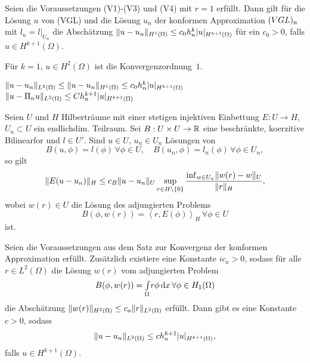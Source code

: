 \documentclass{cheat-sheet}
\newcommand{\IntOmega}[2]{\AInt{\Omega}{#1}{#2}} %
\newcommand{\tss}[1]{\textsubscript{#1}} %
\newcommand{\scp}[2]{\left\langle #1 , #2 \right\rangle} %
\begin{document}
\begin{satz}
  Seien die Voraussetzungen (V1)-(V3) und (V4) mit $r = 1$ erfüllt.
  Dann gilt für die Lösung $u$ von (VGL) und die Lösung $u_n$ der konformen Approximation $(VGL)\tss{n}$ mit $l_n = l|_{U_n}$ die Abschätzung $\lVert u - u_n\rVert_{H^1(\Omega)} \leq c_0 h_n^k \lvert u\rvert_{H^{k+1}(\Omega)}$ für ein $c_0 > 0$, falls $u \in H^{k+1}(\Omega)$.
\end{satz}

\begin{bem}
  Für $k=1$, $u \in H^2(\Omega)$ ist die Konvergenzordnung~$1$.
\end{bem}

\begin{bem}
  $\lVert u - u_n\rVert_{L^2(\Omega)} \leq \lVert u - u_n\rVert_{H^1(\Omega)} \leq c_0 h_n^k \lvert u\rvert_{H^{k+1}(\Omega)}$
  $\lVert u - \Pi_n u\rVert_{L^2(\Omega)} \leq C h_n^{k+1} \lvert u\rvert_{H^{k+1}(\Omega)}$
\end{bem}

\begin{satz}
  Seien $U$ und $H$ Hilberträume mit einer stetigen injektiven Einbettung $E : U \to H$, $U_n \subset U$ ein endlichdim. Teilraum.
  Sei $B : U \times U \to \mathbb{R}$ eine beschränkte, koerzitive Bilinearfor und $l \in U'$.
  Sind $u \in U$, $u_n \in U_n$ Lösungen von
  \[
    B(u, \phi) = l(\phi) \, \forall \phi \in U, \quad
    B(u_n, \phi) = l_n(\phi) \, \forall \phi \in U_n,
  \]
  so gilt
  \[
    \lVert E (u - u_n)\rVert_H \leq c_B \lVert u - u_n\rVert_{U} \sup_{r \in H \setminus \{ 0 \}} \frac{\inf_{w \in U_n} \lVert w(r) - w\rVert_U}{\lVert r\rVert_H},
  \]
  wobei $w(r) \in U$ die Lösung des adjungierten Problems
  \[
    B(\phi, w(r)) = \scp{r}{E(\phi)}_H \, \forall \phi \in U
  \]
  ist.
\end{satz}


\begin{kor}
  Seien die Voraussetzungen aus dem Satz zur Konvergenz der konformen Approximation erfüllt.
  Zusätzlich existiere eine Konstante $ic_a > 0$, sodass für alle $r \in L^2(\Omega)$ die Lösung $w(r)$ vom adjungierten Problem
  \[
    B(\phi, w(r)) = \IntOmega{r \phi}{x} \,
    \forall \phi \in H_1(\Omega)
  \]
  die Abschätzung $\lVert w(r)\rVert_{H^2(\Omega)} \leq c_a \lVert r\rVert_{L^2(\Omega)}$ erfüllt.
  Dann gibt es eine Konstante $c > 0$, sodass
  \[
    \lVert u - u_n\rVert_{L^2(\Omega)} \leq c h^{k+1}_n \lvert u\rvert_{H^{k+1}(\Omega)},
  \]
  falls $u \in H^{k+1}(\Omega)$.
\end{kor}
\end{document}
